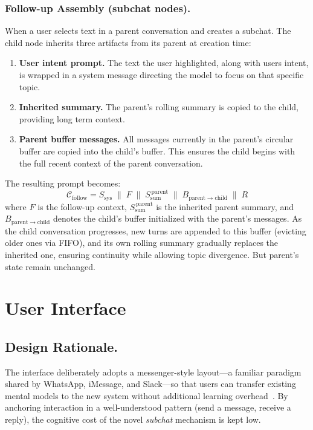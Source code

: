 \subsubsection{Follow-up Assembly (subchat nodes).}
When a user selects text in a parent conversation and creates a subchat. The child node inherits three artifacts from its parent at creation time:
\begin{enumerate}
    \item \textbf{User intent prompt.} The text the user highlighted, along with users intent, is wrapped in a system message directing the model to focus on that specific topic.
    \item \textbf{Inherited summary.} The parent's rolling summary is copied to the child, providing long term context.
    \item \textbf{Parent buffer messages.} All messages currently in the parent's circular buffer are copied into the child's buffer. This ensures the child begins with the full recent context of the parent conversation.
\end{enumerate}
The resulting prompt becomes:
\begin{equation}
\mathcal{C}_{\mathrm{follow}} = S_{\mathrm{sys}} \;\|\; F \;\|\; S_{\mathrm{sum}}^{\,\mathrm{parent}} \;\|\; B_{\mathrm{parent} \to \mathrm{child}} \;\|\; R
\label{eq:context_followup}
\end{equation}
where $F$ is the follow-up context, $S_{\mathrm{sum}}^{\,\mathrm{parent}}$ is the inherited parent summary, and $B_{\mathrm{parent} \to \mathrm{child}}$ denotes the child's buffer initialized with the parent's messages. As the child conversation progresses, new turns are appended to this buffer (evicting older ones via FIFO), and its own rolling summary gradually replaces the inherited one, ensuring continuity while allowing topic divergence. But parent's state remain unchanged.

\section{User Interface}\label{subsec:ui}

\subsection{Design Rationale.}
The interface deliberately adopts a messenger-style layout---a familiar paradigm shared by WhatsApp, iMessage, and Slack---so that users can transfer existing mental models to the new system without additional learning overhead~\cite{nielsen1994usability}. By anchoring interaction in a well-understood pattern (send a message, receive a reply), the cognitive cost of the novel \emph{subchat} mechanism is kept low.

